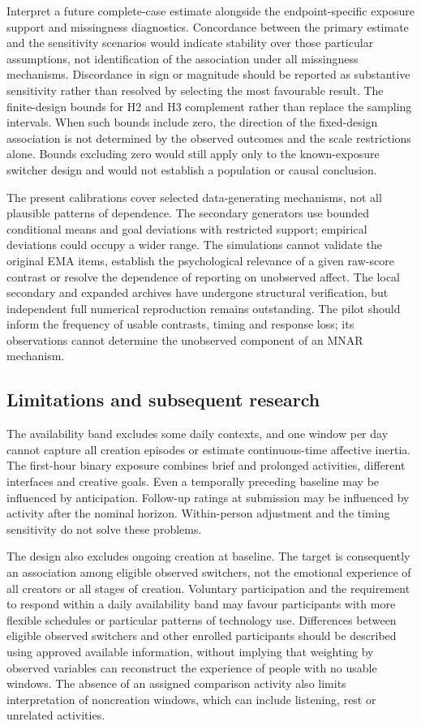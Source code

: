 \documentclass[11pt]{article}
\begin{document}
Interpret a future complete-case estimate alongside the endpoint-specific exposure support and missingness diagnostics. Concordance between the primary estimate and the sensitivity scenarios would indicate stability over those particular assumptions, not identification of the association under all missingness mechanisms. Discordance in sign or magnitude should be reported as substantive sensitivity rather than resolved by selecting the most favourable result. The finite-design bounds for H2 and H3 complement rather than replace the sampling intervals. When such bounds include zero, the direction of the fixed-design association is not determined by the observed outcomes and the scale restrictions alone. Bounds excluding zero would still apply only to the known-exposure switcher design and would not establish a population or causal conclusion.

The present calibrations cover selected data-generating mechanisms, not all plausible patterns of dependence. The secondary generators use bounded conditional means and goal deviations with restricted support; empirical deviations could occupy a wider range. The simulations cannot validate the original EMA items, establish the psychological relevance of a given raw-score contrast or resolve the dependence of reporting on unobserved affect. The local secondary and expanded archives have undergone structural verification, but independent full numerical reproduction remains outstanding. The pilot should inform the frequency of usable contrasts, timing and response loss; its observations cannot determine the unobserved component of an MNAR mechanism.

\subsection{Limitations and subsequent research}
The availability band excludes some daily contexts, and one window per day cannot capture all creation episodes or estimate continuous-time affective inertia. The first-hour binary exposure combines brief and prolonged activities, different interfaces and creative goals. Even a temporally preceding baseline may be influenced by anticipation. Follow-up ratings at submission may be influenced by activity after the nominal horizon. Within-person adjustment and the timing sensitivity do not solve these problems.

The design also excludes ongoing creation at baseline. The target is consequently an association among eligible observed switchers, not the emotional experience of all creators or all stages of creation. Voluntary participation and the requirement to respond within a daily availability band may favour participants with more flexible schedules or particular patterns of technology use. Differences between eligible observed switchers and other enrolled participants should be described using approved available information, without implying that weighting by observed variables can reconstruct the experience of people with no usable windows. The absence of an assigned comparison activity also limits interpretation of noncreation windows, which can include listening, rest or unrelated activities.
\end{document}
